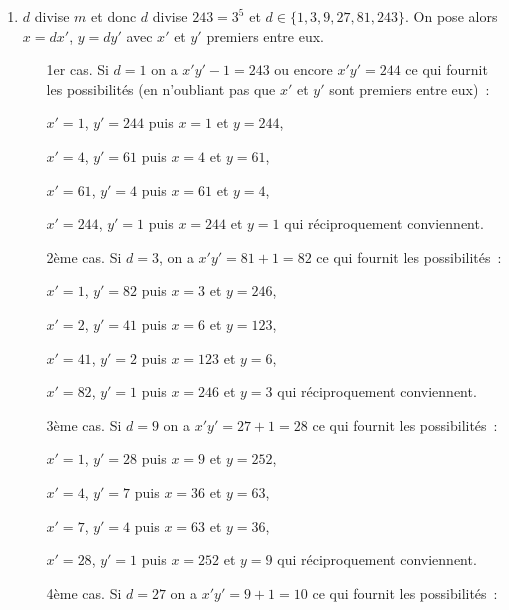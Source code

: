 {{\begin{enumerate}
\begin{itemize}
\item[2ème cas.] $y'=2$ fournit $d=12$, $y=24$, $x=36$ qui réciproquement conviennent.

\item[3ème cas.] $y'=3$ fournit $d=6$, $y=18$, $x=24$ qui réciproquement conviennent.

\item[4ème cas.] $y'= 8$ fournit $d=1$, $y=8$, $x=9$ qui réciproquement conviennent.
\end{itemize}

$$\mathcal{S}=\{(9,8),(24,18),(36,24),(72,36)\}.$$

\item  $d$ divise $m$ et donc $d$ divise $243=3^5$ et $d\in\{1,3,9,27,81,243\}$. On pose alors $x=dx'$, $y=dy'$ avec $x'$ et $y'$ premiers entre eux.

\begin{itemize}
\item[1er cas.] Si $d=1$ on a $x'y'-1=243$ ou encore $x'y'=244$ ce qui fournit les possibilités (en n'oubliant pas que $x'$ et $y'$ sont premiers entre eux)~:

$x'=1$, $y'=244$ puis $x=1$ et $y=244$, 

$x'=4$, $y'=61$ puis $x=4$ et $y=61$,

$x'=61$, $y'=4$ puis $x=61$ et $y=4$,
 
$x'=244$, $y'=1$ puis $x=244$ et $y=1$ qui réciproquement conviennent.

\item[2ème cas.] Si $d=3$, on a $x'y'=81+1=82$ ce qui fournit les possibilités~:

$x'=1$, $y'=82$ puis $x=3$ et $y=246$,
 
$x'=2$, $y'=41$ puis $x=6$ et $y=123$,

$x'=41$, $y'=2$ puis $x=123$ et $y=6$,
 
$x'=82$, $y'=1$ puis $x=246$ et $y=3$ qui réciproquement conviennent.

\item[3ème cas.] Si $d=9$ on a $x'y'=27+1=28$ ce qui fournit les possibilités~:

$x'=1$, $y'=28$ puis $x=9$ et $y=252$,
 
$x'=4$, $y'=7$ puis $x=36$ et $y=63$,

$x'=7$, $y'=4$ puis $x=63$ et $y=36$,
 
$x'=28$, $y'=1$ puis $x=252$ et $y=9$ qui réciproquement conviennent.

\item[4ème cas.] Si $d=27$ on a $x'y'=9+1=10$ ce qui fournit les possibilités~:


\end{itemize}
\end{enumerate}}}
